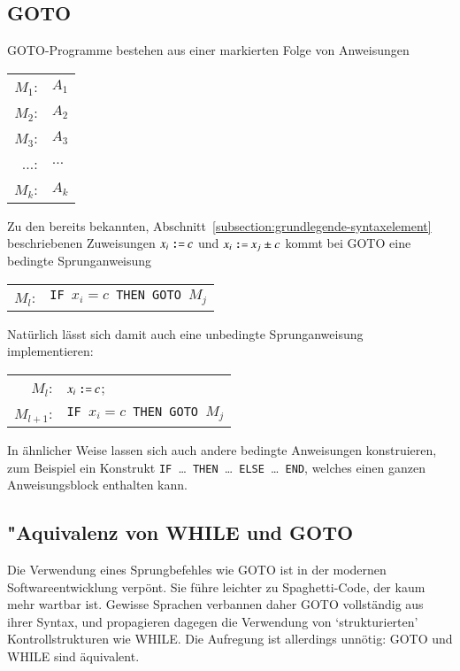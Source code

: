 \subsection{GOTO}
GOTO-Programme bestehen aus einer markierten Folge von Anweisungen
\begin{center}
\begin{tabular}{rl}
$M_1$:&$A_1$\\
$M_2$:&$A_2$\\
$M_3$:&$A_3$\\
$\dots$:&$\dots$\\
$M_k$:&$A_k$
\end{tabular}
\end{center}
Zu den bereits bekannten,
Abschnitt~\ref{subsection:grundlegende-syntaxelement} beschriebenen
Zuweisungen
$x_i \mathbin{\texttt{:=}} c$ 
und
$x_i \mathbin{\texttt{:=}} x_j \pm c$ 
kommt bei GOTO eine bedingte Sprunganweisung
\begin{center}
\begin{tabular}{rl}
$M_l$:&{\tt IF\ }$x_i=c${\tt\ THEN GOTO\ }$M_j$
\end{tabular}
\end{center}
Natürlich lässt sich damit auch eine unbedingte Sprunganweisung
implementieren:
\begin{center}
\begin{tabular}{rl}
$M_l$:&$x_i \mathbin{\texttt{:=}} c$;\\
$M_{l+1}$:&{\tt IF\ }$x_i=c${\tt\ THEN GOTO\ }$M_j$
\end{tabular}
\end{center}
In ähnlicher Weise lassen sich auch andere bedingte Anweisungen
konstruieren, zum Beispiel ein
Konstrukt {\tt IF }\dots{\tt\ THEN }\dots{\tt\ ELSE }\dots{\tt\ END}, welches
einen ganzen Anweisungsblock enthalten kann.

\subsection{"Aquivalenz von WHILE und GOTO}
Die Verwendung eines Sprungbefehles wie GOTO ist in der modernen
Softwareentwicklung verpönt. Sie führe leichter zu Spaghetti-Code,
der kaum mehr wartbar ist. Gewisse Sprachen verbannen daher
GOTO vollständig aus ihrer Syntax, und propagieren dagegen
die Verwendung von `strukturierten' Kontrollstrukturen wie
WHILE. Die Aufregung ist allerdings unnötig: GOTO und WHILE sind äquivalent.


